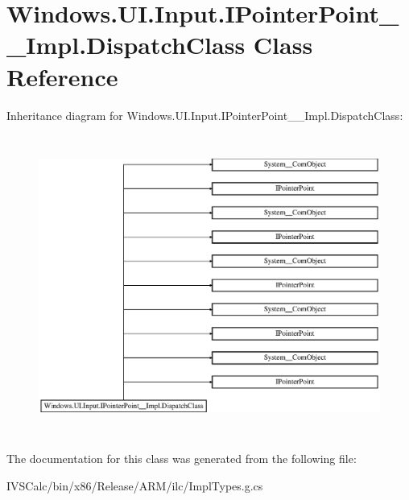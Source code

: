 \hypertarget{class_windows_1_1_u_i_1_1_input_1_1_i_pointer_point_____impl_1_1_dispatch_class}{}\section{Windows.\+U\+I.\+Input.\+I\+Pointer\+Point\+\_\+\+\_\+\+Impl.\+Dispatch\+Class Class Reference}
\label{class_windows_1_1_u_i_1_1_input_1_1_i_pointer_point_____impl_1_1_dispatch_class}
Inheritance diagram for Windows.\+U\+I.\+Input.\+I\+Pointer\+Point\+\_\+\+\_\+\+Impl.\+Dispatch\+Class\+:\begin{figure}[H]
\begin{center}
\leavevmode
\includegraphics[height=9.903537cm]{class_windows_1_1_u_i_1_1_input_1_1_i_pointer_point_____impl_1_1_dispatch_class}
\end{center}
\end{figure}


The documentation for this class was generated from the following file\+:\begin{DoxyCompactItemize}
\item 
I\+V\+S\+Calc/bin/x86/\+Release/\+A\+R\+M/ilc/Impl\+Types.\+g.\+cs\end{DoxyCompactItemize}
